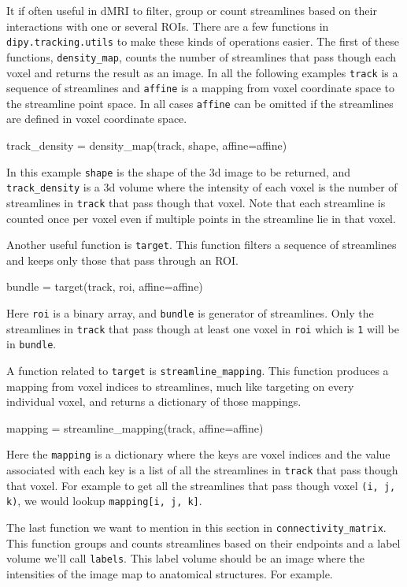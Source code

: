 \documentclass{bioinfo}
\begin{document}
It if often useful in dMRI to filter, group or count streamlines based on their
interactions with one or several ROIs. There are a few functions in
\texttt{dipy.tracking.utils} to make these kinds of operations easier. The
first of these functions, \texttt{density\_map}, counts the number of
streamlines that pass though each voxel and returns the result as an image. In
all the following examples \texttt{track} is a sequence of streamlines and
\texttt{affine} is a mapping from voxel coordinate space to the streamline
point space. In all cases \texttt{affine} can be omitted if the streamlines
are defined in voxel coordinate space.
\begin{python}
track_density = density_map(track, shape,
                            affine=affine)
\end{python}
In this example \texttt{shape} is the shape of the 3d image to be returned, and
\texttt{track\_density} is a 3d volume where the intensity of each voxel is the
number of streamlines in \texttt{track} that pass though that voxel. Note that
each streamline is counted once per voxel even if multiple points in the
streamline lie in that voxel.

Another useful function is \texttt{target}. This function filters a sequence of
streamlines and keeps only those that pass through an ROI. 
\begin{python}
bundle = target(track, roi, affine=affine)
\end{python}
Here \texttt{roi} is a binary array, and \texttt{bundle} is generator of
streamlines.  Only the streamlines in \texttt{track} that pass though at least
one voxel in \texttt{roi} which is \texttt{1} will be in \texttt{bundle}.

A function related to \texttt{target} is \texttt{streamline\_mapping}. This
function produces a mapping from voxel indices to streamlines, much like targeting
on every individual voxel, and returns a dictionary of those mappings.
\begin{python}
mapping = streamline_mapping(track, affine=affine)
\end{python}
Here the \texttt{mapping} is a dictionary where the keys are voxel indices and
the value associated with each key is a list of all the streamlines in
\texttt{track} that pass though that voxel. For example to get all the
streamlines that pass though voxel \texttt{(i, j, k)}, we would lookup
\texttt{mapping[i, j, k]}.

The last function we want to mention in this section in
\texttt{connectivity\_matrix}. This function groups and counts streamlines
based on their endpoints and a label volume we'll call \texttt{labels}. This
label volume should be an image where the intensities of the image map to
anatomical structures. For example.
\end{document}
